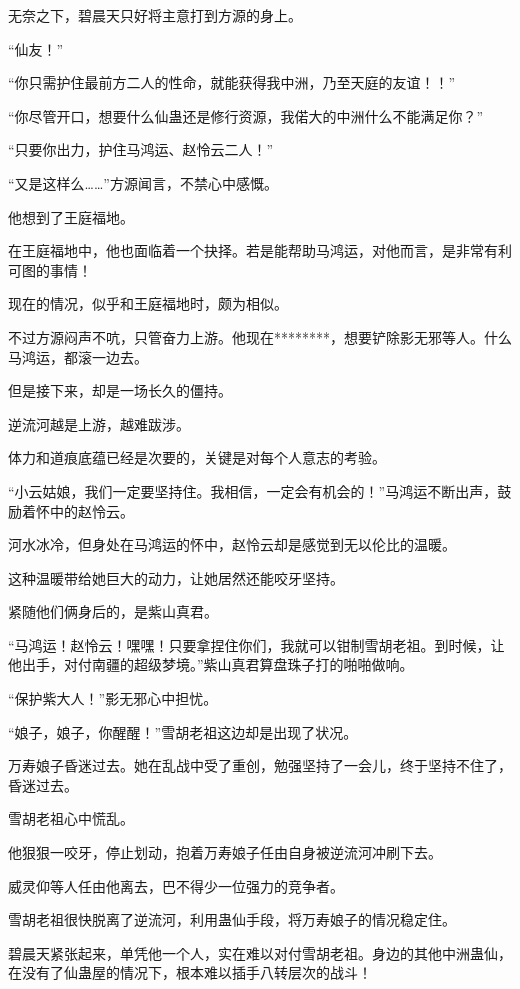 \begin{this_body}
无奈之下，碧晨天只好将主意打到方源的身上。

“仙友！”

“你只需护住最前方二人的性命，就能获得我中洲，乃至天庭的友谊！！”

“你尽管开口，想要什么仙蛊还是修行资源，我偌大的中洲什么不能满足你？”

“只要你出力，护住马鸿运、赵怜云二人！”

“又是这样么……”方源闻言，不禁心中感慨。

他想到了王庭福地。

在王庭福地中，他也面临着一个抉择。若是能帮助马鸿运，对他而言，是非常有利可图的事情！

现在的情况，似乎和王庭福地时，颇为相似。

不过方源闷声不吭，只管奋力上游。他现在********，想要铲除影无邪等人。什么马鸿运，都滚一边去。

但是接下来，却是一场长久的僵持。

逆流河越是上游，越难跋涉。

体力和道痕底蕴已经是次要的，关键是对每个人意志的考验。

“小云姑娘，我们一定要坚持住。我相信，一定会有机会的！”马鸿运不断出声，鼓励着怀中的赵怜云。

河水冰冷，但身处在马鸿运的怀中，赵怜云却是感觉到无以伦比的温暖。

这种温暖带给她巨大的动力，让她居然还能咬牙坚持。

紧随他们俩身后的，是紫山真君。

“马鸿运！赵怜云！嘿嘿！只要拿捏住你们，我就可以钳制雪胡老祖。到时候，让他出手，对付南疆的超级梦境。”紫山真君算盘珠子打的啪啪做响。

“保护紫大人！”影无邪心中担忧。

“娘子，娘子，你醒醒！”雪胡老祖这边却是出现了状况。

万寿娘子昏迷过去。她在乱战中受了重创，勉强坚持了一会儿，终于坚持不住了，昏迷过去。

雪胡老祖心中慌乱。

他狠狠一咬牙，停止划动，抱着万寿娘子任由自身被逆流河冲刷下去。

威灵仰等人任由他离去，巴不得少一位强力的竞争者。

雪胡老祖很快脱离了逆流河，利用蛊仙手段，将万寿娘子的情况稳定住。

碧晨天紧张起来，单凭他一个人，实在难以对付雪胡老祖。身边的其他中洲蛊仙，在没有了仙蛊屋的情况下，根本难以插手八转层次的战斗！


\end{this_body}
